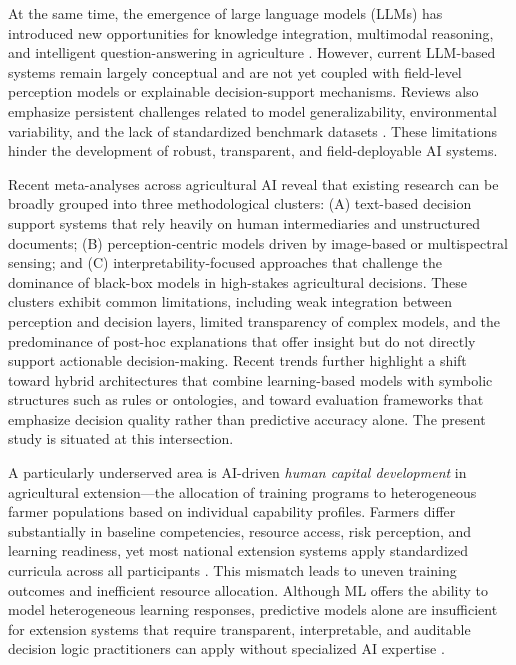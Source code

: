 \documentclass[3p,twocolumn,authoryear]{elsarticle}
\begin{document}
At the same time, the emergence of large language models (LLMs) has
introduced new opportunities for knowledge integration, multimodal
reasoning, and intelligent question-answering in agriculture
\citep{li2025llm}.
However, current LLM-based systems remain largely conceptual and are not
yet coupled with field-level perception models or explainable
decision-support mechanisms.
Reviews also emphasize persistent challenges related to model
generalizability, environmental variability, and the lack of standardized
benchmark datasets \citep{hossain2022cattle,ennaji2023nutrient}.
These limitations hinder the development of robust, transparent, and
field-deployable AI systems.

Recent meta-analyses across agricultural AI reveal that existing research
can be broadly grouped into three methodological clusters: (A) text-based
decision support systems that rely heavily on human intermediaries and
unstructured documents; (B) perception-centric models driven by
image-based or multispectral sensing; and (C) interpretability-focused
approaches that challenge the dominance of black-box models in
high-stakes agricultural decisions. These clusters exhibit common
limitations, including weak integration between perception and decision
layers, limited transparency of complex models, and the predominance of
post-hoc explanations that offer insight but do not directly support
actionable decision-making. Recent trends further highlight a shift
toward hybrid architectures that combine learning-based models with
symbolic structures such as rules or ontologies, and toward evaluation
frameworks that emphasize decision quality rather than predictive
accuracy alone. The present study is situated at this intersection.


A particularly underserved area is AI-driven \textit{human capital
development} in agricultural extension---the allocation of training
programs to heterogeneous farmer populations based on individual
capability profiles.
Farmers differ substantially in baseline competencies, resource access,
risk perception, and learning readiness, yet most national extension
systems apply standardized curricula across all participants
\citep{anderson2004,feder1985}.
This mismatch leads to uneven training outcomes and inefficient resource
allocation.
Although ML offers the ability to model heterogeneous learning responses,
predictive models alone are insufficient for extension systems that
require transparent, interpretable, and auditable decision logic
practitioners can apply without specialized AI expertise
\citep{arrieta2020,lundberg2020}.
\end{document}
